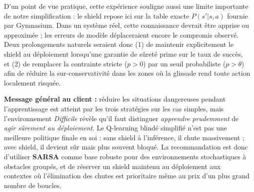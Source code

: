 \documentclass{article}
\begin{document}
D'un point de vue pratique, cette expérience souligne aussi une limite importante de notre simplification : le shield repose ici sur la table exacte $P(s'|s,a)$ fournie par Gymnasium. Dans un système réel, cette connaissance devrait être apprise ou approximée ; les erreurs de modèle déplaceraient encore le compromis observé. Deux prolongements naturels seraient donc (1) de maintenir explicitement le shield au déploiement lorsqu'une garantie de sûreté prime sur le taux de succès, et (2) de remplacer la contrainte stricte ($p>0$) par un seuil probabiliste ($p>\theta$) afin de réduire la sur-conservativité dans les zones où la glissade rend toute action localement risquée.

\textbf{Message général au client :} réduire les situations dangereuses pendant l'apprentissage est atteint par les trois stratégies sur les cas simples, mais l'environnement \textit{Difficile} révèle qu'il faut distinguer \emph{apprendre prudemment} de \emph{agir sûrement au déploiement}. Le Q-learning blindé simplifié n'est pas une meilleure politique finale en soi : sans shield à l'inférence, il chute massivement ; avec shield, il devient sûr mais plus souvent bloqué. La recommandation est donc d'utiliser \textbf{SARSA} comme base robuste pour des environnements stochastiques à obstacles groupés, et de réserver un shield maintenu au déploiement aux contextes où l'élimination des chutes est prioritaire même au prix d'un plus grand nombre de boucles.

\newpage


\end{document}
